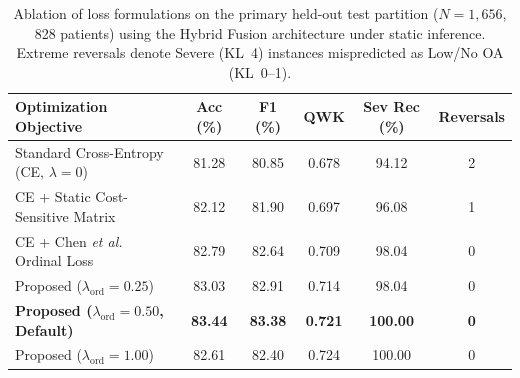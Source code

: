\documentclass[10pt,journal]{IEEEtran}
\begin{document}
\begin{table}[t]
\centering
\caption{Ablation of loss formulations on the primary held-out test partition ($N = 1{,}656$, 828 patients) using the Hybrid Fusion architecture under static inference. Extreme reversals denote Severe (KL~4) instances mispredicted as Low/No OA (KL~0--1).}
\label{tab:loss_ablation}
\scriptsize
\setlength{\tabcolsep}{3pt}
\renewcommand{\arraystretch}{1.1}
\begin{tabularx}{\columnwidth}{@{}Xccccc@{}}
\toprule
\textbf{Optimization Objective} & \textbf{Acc (\%)} & \textbf{F1 (\%)} & \textbf{QWK} & \textbf{Sev Rec (\%)} & \textbf{Reversals} \\
\midrule
Standard Cross-Entropy (CE, $\lambda=0$) & 81.28 & 80.85 & 0.678 & 94.12 & 2 \\
CE + Static Cost-Sensitive Matrix & 82.12 & 81.90 & 0.697 & 96.08 & 1 \\
CE + Chen \textit{et al.} Ordinal Loss \cite{chen2019fully} & 82.79 & 82.64 & 0.709 & 98.04 & 0 \\
Proposed ($\lambda_{\text{ord}} = 0.25$) & 83.03 & 82.91 & 0.714 & 98.04 & 0 \\
\textbf{Proposed ($\lambda_{\text{ord}} = 0.50$, Default)} & \textbf{83.44} & \textbf{83.38} & \textbf{0.721} & \textbf{100.00} & \textbf{0} \\
Proposed ($\lambda_{\text{ord}} = 1.00$) & 82.61 & 82.40 & 0.724 & 100.00 & 0 \\
\bottomrule
\end{tabularx}
\end{table}
\end{document}
